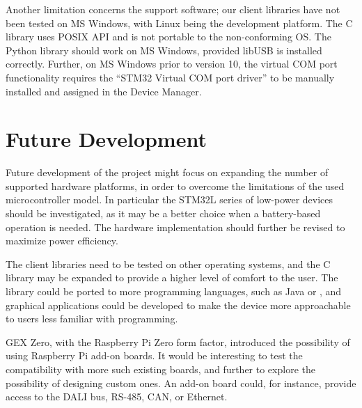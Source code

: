 Another limitation concerns the support software; our client libraries have not been tested on MS Windows, with Linux being the development platform. The C library uses POSIX \gls{API} and is not portable to the non-conforming \gls{OS}. The Python library should work on MS Windows, provided libUSB is installed correctly. Further, on MS Windows prior to version 10, the virtual COM port functionality requires the ``STM32 Virtual COM port driver'' to be manually installed and assigned in the Device Manager. 

\section{Future Development}

Future development of the project might focus on expanding the number of supported hardware platforms, in order to overcome the limitations of the used microcontroller model. In particular the STM32L series of low-power devices should be investigated, as it may be a better choice when a battery-based operation is needed. The hardware implementation should further be revised to maximize power efficiency.

The client libraries need to be tested on other operating systems, and the C library may be expanded to provide a higher level of comfort to the user. The library could be ported to more programming languages, such as Java or \CS, and graphical applications could be developed to make the device more approachable to users less familiar with programming.

GEX Zero, with the Raspberry Pi Zero form factor, introduced the possibility of using Raspberry Pi add-on boards. It would be interesting to test the compatibility with more such existing boards, and further to explore the possibility of designing custom ones. An add-on board could, for instance, provide access to the \gls{DALI} bus, RS-485, \gls{CAN}, or Ethernet.





